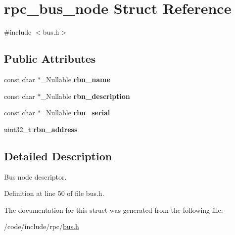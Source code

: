 \hypertarget{structrpc__bus__node}{}\section{rpc\+\_\+bus\+\_\+node Struct Reference}
\label{structrpc__bus__node}


{\ttfamily \#include $<$bus.\+h$>$}

\subsection*{Public Attributes}
\begin{DoxyCompactItemize}
\item 
const char $\ast$\+\_\+\+Nullable {\bfseries rbn\+\_\+name}\hypertarget{structrpc__bus__node_a9afbf9a155ae01c1c47dc210a8334022}{}\label{structrpc__bus__node_a9afbf9a155ae01c1c47dc210a8334022}

\item 
const char $\ast$\+\_\+\+Nullable {\bfseries rbn\+\_\+description}\hypertarget{structrpc__bus__node_af5d23beee7c50520e7235f0c922fafb1}{}\label{structrpc__bus__node_af5d23beee7c50520e7235f0c922fafb1}

\item 
const char $\ast$\+\_\+\+Nullable {\bfseries rbn\+\_\+serial}\hypertarget{structrpc__bus__node_a885b358a61a0b459d86d7c534be6ef0f}{}\label{structrpc__bus__node_a885b358a61a0b459d86d7c534be6ef0f}

\item 
uint32\+\_\+t {\bfseries rbn\+\_\+address}\hypertarget{structrpc__bus__node_a624e2a0be665938924ab2f815afb669e}{}\label{structrpc__bus__node_a624e2a0be665938924ab2f815afb669e}

\end{DoxyCompactItemize}


\subsection{Detailed Description}
Bus node descriptor. 

Definition at line 50 of file bus.\+h.



The documentation for this struct was generated from the following file\+:\begin{DoxyCompactItemize}
\item 
/code/include/rpc/\hyperlink{bus_8h}{bus.\+h}\end{DoxyCompactItemize}
